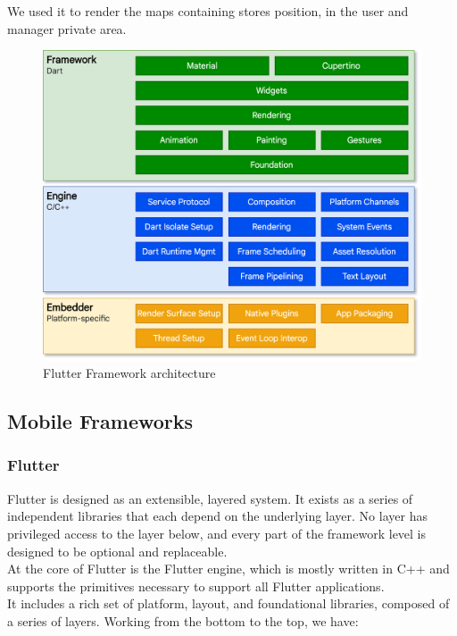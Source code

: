 \documentclass[table, 12pt]{article}
\begin{document}
We used it to render the maps containing stores position, in the user and manager private area.
\newpage
\begin{figure}[H]
    \includegraphics[width=\textwidth]{assets/FlutterArchitecture.png}
    \caption{Flutter Framework architecture}
\end{figure}
\subsection{Mobile Frameworks}
\subsubsection{Flutter}
Flutter is designed as an extensible, layered system. It exists as a series of independent libraries that each depend on the underlying layer. No layer has privileged access to the layer below, and every part of the framework level is designed to be optional and replaceable.\\
At the core of Flutter is the Flutter engine, which is mostly written in C++ and supports the primitives necessary to support all Flutter applications.\\
It includes a rich set of platform, layout, and foundational libraries, composed of a series of layers. Working from the bottom to the top, we have:
\end{document}
